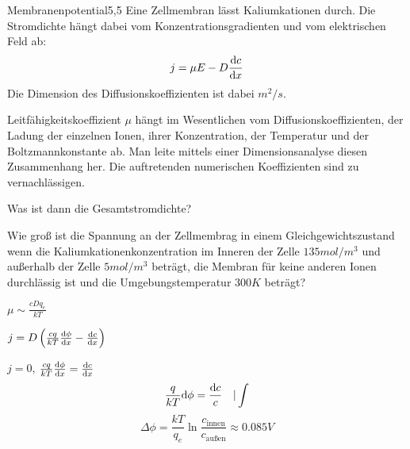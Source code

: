 \begin{problem}{Membranenpotential}{5,5}
Eine Zellmembran lässt Kaliumkationen durch. Die Stromdichte hängt dabei vom Konzentrationsgradienten und vom elektrischen Feld ab:
\[
j = \mu E - D \frac{\mathrm{d} c}{\mathrm{d} x}
\]
Die Dimension des Diffusionskoeffizienten ist dabei $\unit{m^2/s}$.
\begin{abcenum}
\item Leitfähigkeitskoeffizient $\mu$ hängt im Wesentlichen vom Diffusionskoeffizienten, der Ladung der einzelnen Ionen, ihrer Konzentration, der Temperatur und der Boltzmannkonstante ab. Man leite mittels einer Dimensionsanalyse diesen Zusammenhang her. Die auftretenden numerischen Koeffizienten sind zu vernachlässigen.
\item Was ist dann die Gesamtstromdichte?
\item Wie groß ist die Spannung an der Zellmembrag in einem Gleichgewichtszustand wenn die Kaliumkationenkonzentration im Inneren der Zelle $135 \unit{mol/m^3}$ und außerhalb der Zelle $5 \unit{mol/m^3}$ beträgt, die Membran für keine anderen Ionen durchlässig ist und die Umgebungstemperatur $300 \unit{K}$ beträgt?
\end{abcenum}

\begin{solution}
\begin{abcenum}
\item $\mu \sim \frac{cDq_e}{kT}$
\item $j = D \left( \frac{cq}{kT} \frac{\mathrm{d}\phi}{\mathrm{d} x} - \frac{\mathrm{d} c}{\mathrm{d} x} \right)$
\item $j=0$, $\frac{cq}{kT} \frac{\mathrm{d}\phi}{\mathrm{d} x} = \frac{\mathrm{d} c}{\mathrm{d} x}$
\[
\frac{q}{kT} \mathrm{d}\phi = \frac{\mathrm{d} c}{c} \quad | \int
\]
\[
\Delta \phi = \frac{kT}{q_e} \ln \frac{c_\mathrm{innen}}{c_\mathrm{außen}} \approx 0.085 \unit{V}
\]
\end{abcenum}
\end{solution}
\end{problem}


